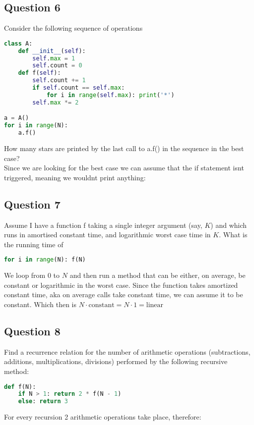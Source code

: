 \subsection{Question 6}
Consider the following sequence of operations
\begin{lstlisting}[language=python]
class A:
    def __init__(self):
        self.max = 1
        self.count = 0
    def f(self):
        self.count += 1
        if self.count == self.max:
            for i in range(self.max): print('*')
        self.max *= 2

a = A()
for i in range(N): 
    a.f()
\end{lstlisting}
How many stars are printed by the last call to a.f() in the sequence in the best case?\\
Since we are looking for the best case we can assume that the if statement isnt triggered, meaning we wouldnt print anything:\\[1ex]


\subsection{Question 7}
Assume I have a function f taking a single integer argument (say, $K$) and which runs in amortised constant time, and logarithmic worst case time in $K$. What is the running time of 
\begin{lstlisting}[language=python]
for i in range(N): f(N)
\end{lstlisting}
We loop from 0 to $N$ and then run a method that can be either, on average, be constant or logarithmic in the worst case.
Since the function takes amortized constant time, aka on average calls take constant time, we can assume it to be constant. 
Which then is $N\cdot \text{constant} = N\cdot 1 = \text{linear}$\\[1ex]


\subsection{Question 8}
Find a recurrence relation for the number of arithmetic operations (subtractions, additions, multiplications, divisions) performed by the following recursive method:
\begin{lstlisting}[language=python]
def f(N):
    if N > 1: return 2 * f(N - 1)
    else: return 3
\end{lstlisting}
For every recursion 2 arithmetic operations take place, therefore:\\[1ex]


